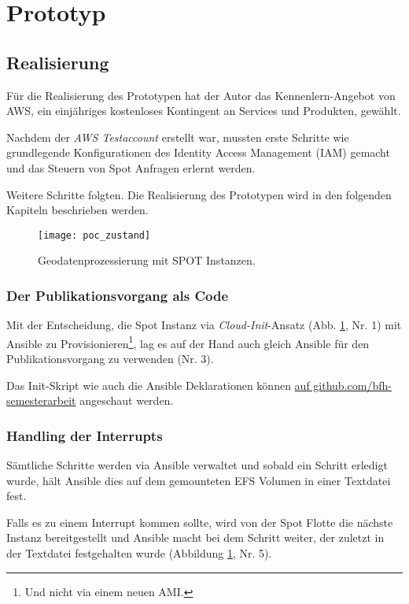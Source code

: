 \section{Prototyp}
\subsection{Realisierung}
Für die Realisierung des Prototypen hat der Autor das Kennenlern-Angebot von AWS, ein einjähriges kostenloses Kontingent an Services und Produkten\cite{FreeTier2020}, gewählt. 

Nachdem der \emph{AWS Testaccount} erstellt war, mussten erste Schritte wie grundlegende Konfigurationen des Identity Access Management (IAM) gemacht und das Steuern von Spot Anfragen erlernt werden.

Weitere Schritte folgten. Die Realisierung des Prototypen wird in den folgenden Kapiteln beschrieben werden.

\begin{figure}[H]
	\centering
	\texttt{[image: poc\_zustand]}
	\caption{Geodatenprozessierung mit SPOT Instanzen.}
	\label{fig:ist_zustand}
\end{figure}

\subsubsection{Der Publikationsvorgang als Code}
Mit der Entscheidung, die Spot Instanz via \emph{Cloud-Init}-Ansatz (Abb. \ref{fig:ist_zustand}, Nr. 1) mit Ansible zu Provisionieren\footnote{Und nicht via einem neuen AMI.}, lag es auf der Hand auch gleich Ansible für den Publikationsvorgang zu verwenden (Nr. 3).

Das Init-Skript wie auch die Ansible Deklarationen können \href{https://github.com/bfh-semesterarbeit/up-and-running-dataprocessing}{auf github.com/bfh-semesterarbeit} angeschaut werden.




\subsubsection{Handling der Interrupts}
Sämtliche Schritte werden via Ansible verwaltet und sobald ein Schritt erledigt wurde, hält Ansible dies auf dem gemounteten EFS Volumen in einer Textdatei fest.

Falls es zu einem Interrupt kommen sollte, wird von der Spot Flotte die nächste Instanz bereitgestellt und Ansible macht bei dem Schritt weiter, der zuletzt in der Textdatei festgehalten wurde (Abbildung \ref{fig:ist_zustand}, Nr. 5).


